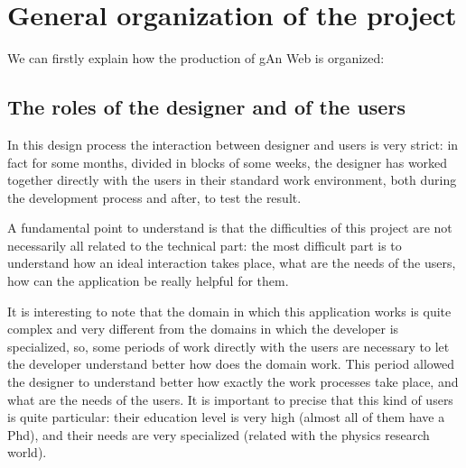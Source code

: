 
\chapter{General organization of the project} %

\label{Chapter2} %


We can firstly explain how the production of gAn Web is organized:

\section{The roles of the designer and of the users}
In this design process the interaction between designer and users is very strict: in fact for some months, divided in blocks of some weeks, the designer has worked together directly with the users in their standard work environment, both during the development process and after, to test the result. 

A fundamental point to understand is that the difficulties of this project are not necessarily all related to the technical part: the most difficult part is to understand how an ideal interaction takes place, what are the needs of the users, how can the application be really helpful for them.
 
It is interesting to note that the domain in which this application works is quite complex and very different from the domains in which the developer is specialized, so, some periods of work directly with the users are necessary to let the developer understand better how does the domain work.
This period allowed the designer to understand better how exactly the work processes take place, and what are the needs of the users. 
It is important to precise that this kind of users is quite particular: their education level is very high (almost all of them have a Phd), and their needs are very specialized (related with the physics research world).

